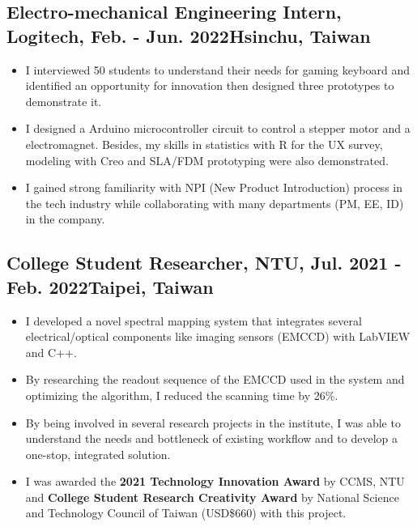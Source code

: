 \documentclass[12pt]{article}
\begin{document}
        \subsection*{Electro-mechanical Engineering Intern, Logitech, Feb. - Jun. 2022\hfill Hsinchu, Taiwan}
        {\sffamily \small
        \begin{itemize}
            \item I interviewed 50 students to understand their needs for gaming keyboard and identified an opportunity for innovation then designed three prototypes to demonstrate it.
            \item I designed a Arduino microcontroller circuit to control a stepper motor and a electromagnet. Besides, my skills in statistics with R for the UX survey, modeling with Creo and SLA/FDM prototyping were also demonstrated.
            \item I gained strong familiarity with NPI (New Product Introduction) process in the tech industry while collaborating with many departments (PM, EE, ID) in the company.
        \end{itemize}
        }
        \subsection*{College Student Researcher, NTU, Jul. 2021 - Feb. 2022\hfill Taipei, Taiwan}
        {\sffamily \small
        \begin{itemize}
            \item I developed a novel spectral mapping system that integrates several electrical/optical components like imaging sensors (EMCCD) with LabVIEW and C++. %
            \item By researching the readout sequence of the EMCCD used in the system and optimizing the algorithm, I reduced the scanning time by 26\%.
            \item By being involved in several research projects in the institute, I was able to understand the needs and bottleneck of existing workflow and to develop a one-stop, integrated solution.
            \item I was awarded the \textbf{2021 Technology Innovation Award} by CCMS, NTU and \textbf{College Student Research Creativity Award} by National Science and Technology Council of Taiwan (USD\$660) with this project.
        \end{itemize}}
\end{document}
